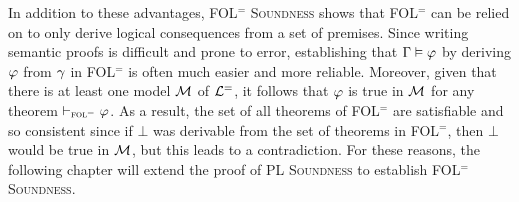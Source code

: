 In addition to these advantages, \textsc{FOL$^=$ Soundness} shows that FOL$^=$ can be relied on to only derive logical consequences from a set of premises.
Since writing semantic proofs is difficult and prone to error, establishing that $\Gamma \vDash \varphi$ by deriving $\varphi$ from $\gamma$ in FOL$^=$ is often much easier and more reliable.
Moreover, given that there is at least one model $\mathcal{M}$ of $\mathcal{L}^{=}$, it follows that $\varphi$ is true in $\mathcal{M}$ for any theorem $\vdash_{\textsc{fol}^=} \varphi$. 
As a result, the set of all theorems of FOL$^=$ are satisfiable and so consistent since if $\bot$ was derivable from the set of theorems in FOL$^=$, then $\bot$ would be true in $\mathcal{M}$, but this leads to a contradiction.
For these reasons, the following chapter will extend the proof of \textsc{PL Soundness} to establish \textsc{FOL$^=$ Soundness}.





\iffalse

\practiceproblems

